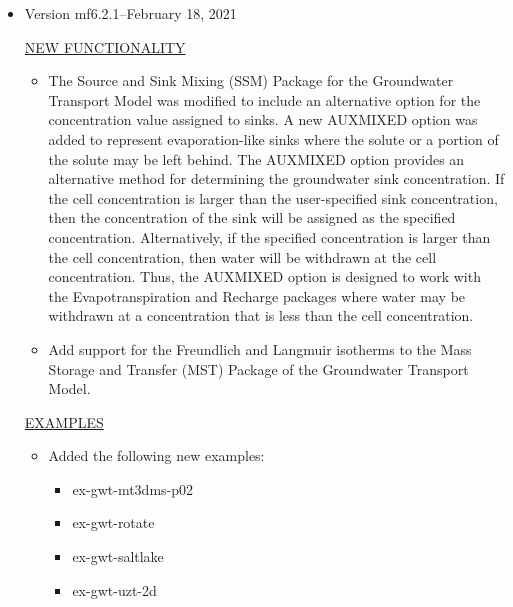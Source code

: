 \documentclass[11pt,twoside,twocolumn]{usgsreport}
\begin{document}
\begin{itemize}
	\item Version mf6.2.1--February 18, 2021

	\underline{NEW FUNCTIONALITY}
	\begin{itemize}
	        \item The Source and Sink Mixing (SSM) Package for the Groundwater Transport Model was modified to include an alternative option for the concentration value assigned to sinks.  A new AUXMIXED option was added to represent evaporation-like sinks where the solute or a portion of the solute may be left behind.  The AUXMIXED option provides an alternative method for determining the groundwater sink concentration.  If the cell concentration is larger than the user-specified sink concentration, then the concentration of the sink will be assigned as the specified concentration.  Alternatively, if the specified concentration is larger than the cell concentration, then water will be withdrawn at the cell concentration.  Thus, the AUXMIXED option is designed to work with the Evapotranspiration and Recharge packages where water may be withdrawn at a concentration that is less than the cell concentration.  
	        \item Add support for the Freundlich and Langmuir isotherms to the Mass Storage and Transfer (MST) Package of the Groundwater Transport Model.
	\end{itemize}
	
	\underline{EXAMPLES}
	\begin{itemize}
	        \item Added the following new examples: 
	        \begin{itemize}
	          \item ex-gwt-mt3dms-p02
	          \item ex-gwt-rotate
	          \item ex-gwt-saltlake
	          \item ex-gwt-uzt-2d
	        \end{itemize}
	\end{itemize}


\end{itemize}
\end{document}
